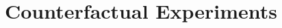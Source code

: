 \documentclass[11pt,hyperref={bookmarks=false},table,aspectratio=169]{beamer}
\begin{document}
\section{Counterfactual Experiments}
%
%
%
%
%
%
\end{document}
